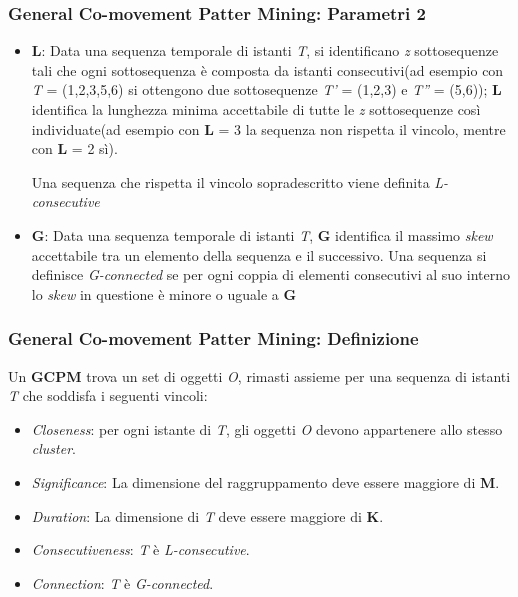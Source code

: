 \documentclass{beamer}
\begin{document}
\begin{frame}
\frametitle{General Co-movement Patter Mining: Parametri 2}

\begin{itemize}

\item \textbf{L}: Data una sequenza temporale di istanti \textit{T}, si identificano \textit{z} sottosequenze tali che ogni sottosequenza è composta da istanti consecutivi(ad esempio con \textit{T} = (1,2,3,5,6) si ottengono due sottosequenze \textit{T'} = 
(1,2,3) e \textit{T''} = (5,6)); \textbf{L} identifica la lunghezza minima accettabile di tutte le \textit{z} sottosequenze così individuate(ad esempio con \textbf{L} = 3 la sequenza non rispetta il vincolo, mentre con \textbf{L} = 2 sì).

Una sequenza che rispetta il vincolo sopradescritto viene definita \textit{L-consecutive}
\item \textbf{G}:  Data una sequenza temporale di istanti \textit{T}, \textbf{G} identifica il massimo \textit{skew} accettabile tra un elemento della sequenza e il successivo. Una sequenza si definisce \textit{G-connected} se per ogni coppia di elementi consecutivi al suo interno 
lo \textit{skew} in questione è minore o uguale a \textbf{G} 

\end{itemize}

\end{frame}

\begin{frame}
\frametitle{General Co-movement Patter Mining: Definizione}

Un \textbf{GCPM} trova un set di oggetti \textit{O}, rimasti assieme per una sequenza di istanti \textit{T} che soddisfa i seguenti vincoli:

\begin{itemize}

\item \textit{Closeness}: per ogni istante di \textit{T}, gli oggetti \textit{O} devono appartenere allo stesso \textit{cluster}.
\item \textit{Significance}: La dimensione del raggruppamento deve essere maggiore di \textbf{M}.
\item \textit{Duration}: La dimensione di \textit{T} deve essere maggiore di \textbf{K}.
\item \textit{Consecutiveness}: \textit{T} è \textit{L-consecutive}.
\item \textit{Connection}: \textit{T} è \textit{G-connected}.


\end{itemize}

\end{frame}
\end{document}

